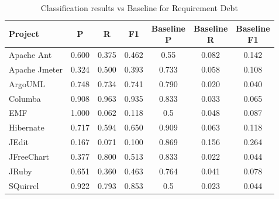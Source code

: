\begin{table}[!hbt]
    \begin{center}
        \caption{Classification results vs Baseline for Requirement Debt}
        \label{tbl:classifier_results_vs_baseline_requirement}
        \begin{tabular}{l| c c c c c c}
        \toprule
        \textbf{Project} & \textbf{P} & \textbf{R} & \textbf{F1} & \thead{Baseline\\P} & \thead{Baseline\\R} & \thead{Baseline\\F1} \\
        \midrule
        Apache Ant    &                  0.600 &            0.375 &        0.462 &      0.55           & 0.082     & 0.142  \\
        Apache Jmeter &                  0.324 &            0.500 &        0.393 &      0.733          & 0.058     & 0.108  \\
        ArgoUML       &                  0.748 &            0.734 &        0.741 &      0.790          & 0.020     & 0.040  \\
        Columba       &                  0.908 &            0.963 &        0.935 &      0.833          & 0.033     & 0.065  \\
        EMF           &                  1.000 &            0.062 &        0.118 &      0.5            & 0.048     & 0.087  \\
        Hibernate     &                  0.717 &            0.594 &        0.650 &      0.909          & 0.063     & 0.118  \\
        JEdit         &                  0.167 &            0.071 &        0.100 &      0.869          & 0.156     & 0.264  \\
        JFreeChart    &                  0.377 &            0.800 &        0.513 &      0.833          & 0.022     & 0.044  \\
        JRuby         &                  0.651 &            0.360 &        0.463 &      0.764          & 0.041     & 0.078  \\
        SQuirrel      &                  0.922 &            0.793 &        0.853 &      0.5            & 0.023     & 0.044  \\
        \bottomrule
        \end{tabular}
    \end{center}    
\end{table}



